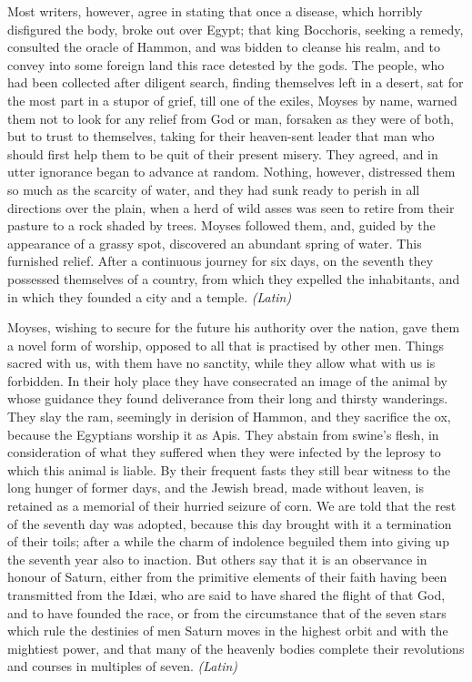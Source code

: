 
Most writers, however, agree in stating that once a disease, which horribly disfigured the body, broke out over Egypt; that king Bocchoris, seeking a remedy, consulted the oracle of Hammon, and was bidden to cleanse his realm, and to convey into some foreign land this race detested by the gods. The people, who had been collected after diligent search, finding themselves left in a desert, sat for the most part in a stupor of grief, till one of the exiles, Moyses by name, warned them not to look for any relief from God or man, forsaken as they were of both, but to trust to themselves, taking for their heaven-sent leader that man who should first help them to be quit of their present misery. They agreed, and in utter ignorance began to advance at random. Nothing, however, distressed them so much as the scarcity of water, and they had sunk ready to perish in all directions over the plain, when a herd of wild asses was seen to retire from their pasture to a rock shaded by trees. Moyses followed them, and, guided by the appearance of a grassy spot, discovered an abundant spring of water. This furnished relief. After a continuous journey for six days, on the seventh they possessed themselves of a country, from which they expelled the inhabitants, and in which they founded a city and a temple. \emph{(Latin)}


Moyses, wishing to secure for the future his authority over the nation, gave them a novel form of worship, opposed to all that is practised by other men. Things sacred with us, with them have no sanctity, while they allow what with us is forbidden. In their holy place they have consecrated an image of the animal by whose guidance they found deliverance from their long and thirsty wanderings. They slay the ram, seemingly in derision of Hammon, and they sacrifice the ox, because the Egyptians worship it as Apis. They abstain from swine's flesh, in consideration of what they suffered when they were infected by the leprosy to which this animal is liable. By their frequent fasts they still bear witness to the long hunger of former days, and the Jewish bread, made without leaven, is retained as a memorial of their hurried seizure of corn. We are told that the rest of the seventh day was adopted, because this day brought with it a termination of their toils; after a while the charm of indolence beguiled them into giving up the seventh year also to inaction. But others say that it is an observance in honour of Saturn, either from the primitive elements of their faith having been transmitted from the Idæi, who are said to have shared the flight of that God, and to have founded the race, or from the circumstance that of the seven stars which rule the destinies of men Saturn moves in the highest orbit and with the mightiest power, and that many of the heavenly bodies complete their revolutions and courses in multiples of seven. \emph{(Latin)}

